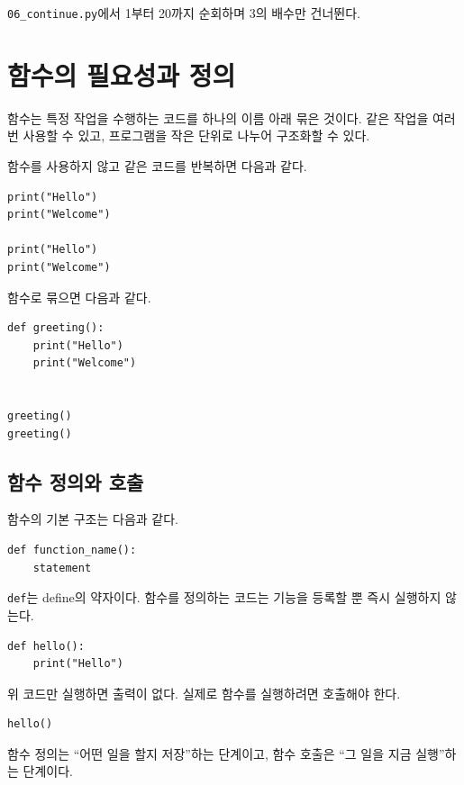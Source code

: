 \documentclass[11pt,a4paper]{article}
\begin{document}
\begin{practicebox}
\texttt{06\_continue.py}에서 1부터 20까지 순회하며 3의 배수만 건너뛴다.
\end{practicebox}

\section{함수의 필요성과 정의}

함수는 특정 작업을 수행하는 코드를 하나의 이름 아래 묶은 것이다. 같은 작업을 여러 번 사용할 수 있고, 프로그램을 작은 단위로 나누어 구조화할 수 있다.

함수를 사용하지 않고 같은 코드를 반복하면 다음과 같다.

\begin{lstlisting}
print("Hello")
print("Welcome")

print("Hello")
print("Welcome")
\end{lstlisting}

함수로 묶으면 다음과 같다.

\begin{lstlisting}
def greeting():
    print("Hello")
    print("Welcome")


greeting()
greeting()
\end{lstlisting}

\subsection{함수 정의와 호출}

함수의 기본 구조는 다음과 같다.

\begin{lstlisting}
def function_name():
    statement
\end{lstlisting}

\texttt{def}는 define의 약자이다. 함수를 정의하는 코드는 기능을 등록할 뿐 즉시 실행하지 않는다.

\begin{lstlisting}
def hello():
    print("Hello")
\end{lstlisting}

위 코드만 실행하면 출력이 없다. 실제로 함수를 실행하려면 호출해야 한다.

\begin{lstlisting}
hello()
\end{lstlisting}

\begin{importantbox}
함수 정의는 ``어떤 일을 할지 저장''하는 단계이고, 함수 호출은 ``그 일을 지금 실행''하는 단계이다.
\end{importantbox}
\end{document}
